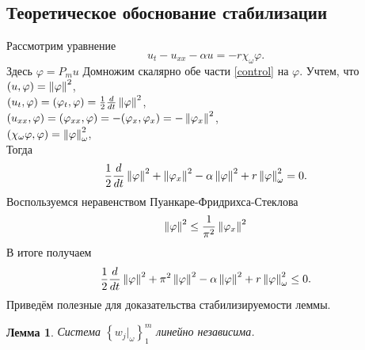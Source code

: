 \subsection{Теоретическое обоснование стабилизации}
Рассмотрим уравнение
\begin{equation}\label{control}
	u_t - u_{xx} - \alpha u = -r\chi_{\omega}\varphi.
\end{equation}
Здесь $\varphi = P_mu$
Домножим скалярно обе части \eqref{control} на $\varphi$. Учтем, что\\
$(u, \varphi) = \left\lVert\varphi\right\rVert^2$,\\
$(u_t, \varphi) = (\varphi_t, \varphi) = \frac{1}{2} \frac{d}{dt} \left\lVert\varphi\right\rVert^2$,\\
$(u_{xx}, \varphi) = (\varphi_{xx}, \varphi) = -(\varphi_x, \varphi_x) = - \left\lVert\varphi_x\right\rVert^2$,\\
$(\chi_{\omega}\varphi, \varphi) = \left\lVert\varphi\right\rVert^2_{\omega}$,\\
Тогда
\begin{equation*}
\frac{1}{2} \frac{d}{dt} \left\lVert\varphi\right\rVert^2  + \left\lVert\varphi_x\right\rVert^2- \alpha \left\lVert\varphi\right\rVert^2 + r \left\lVert\varphi\right\rVert^2_{\omega} = 0.
\end{equation*}
Воспользуемся неравенством Пуанкаре-Фридрихса-Стеклова 
\begin{equation}
	\left\lVert\varphi\right\rVert^2 \le \frac{1}{\pi^2} \left\lVert\varphi_x\right\rVert^2
\end{equation}
В итоге получаем
\begin{equation}
	\frac{1}{2} \frac{d}{dt} \left\lVert\varphi\right\rVert^2 + \pi^2 \left\lVert\varphi\right\rVert^2 - \alpha \left\lVert\varphi\right\rVert^2 + r \left\lVert\varphi\right\rVert^2_{\omega} \le 0.	
\end{equation}
Приведём полезные для доказательства стабилизируемости леммы.

\newtheorem{lemma}{Лемма}

\begin{lemma}\label{util_lemma}
Система $\left\{ w_j|_{\omega} \right\}^m_1$ линейно независима.
\end{lemma}

